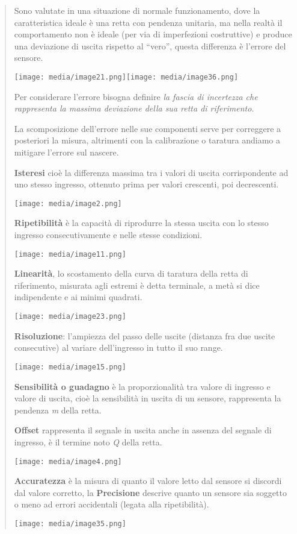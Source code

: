 \begin{quote}
Sono valutate in una situazione di normale funzionamento, dove la
caratteristica ideale è una retta con pendenza unitaria, ma nella realtà
il comportamento non è ideale (per via di imperfezioni costruttive) e
produce una deviazione di uscita rispetto al ``vero'', questa differenza
è l'errore del sensore.

\texttt{[image: media/image21.png]}\texttt{[image: media/image36.png]}

Per considerare l'errore bisogna definire \emph{la fascia di incertezza
che rappresenta la massima deviazione della sua retta di riferimento.}

La scomposizione dell'errore nelle sue componenti serve per correggere a
posteriori la misura, altrimenti con la calibrazione o taratura andiamo
a mitigare l'errore sul nascere.

\textbf{Isteresi} cioè la differenza massima tra i valori di uscita
corrispondente ad uno stesso ingresso, ottenuto prima per valori
crescenti, poi decrescenti.

\texttt{[image: media/image2.png]}

\textbf{Ripetibilità} è la capacità di riprodurre la stessa uscita con
lo stesso ingresso consecutivamente e nelle stesse condizioni.

\texttt{[image: media/image11.png]}

\textbf{Linearità}, lo scostamento della curva di taratura della retta
di riferimento, misurata agli estremi è detta terminale, a metà si dice
indipendente e ai minimi quadrati.

\texttt{[image: media/image23.png]}

\textbf{Risoluzione}: l'ampiezza del passo delle uscite (distanza fra
due uscite consecutive) al variare dell'ingresso in tutto il suo range.

\texttt{[image: media/image15.png]}

\textbf{Sensibilità o guadagno} è la proporzionalità tra valore di
ingresso e valore di uscita, cioè la sensibilità in uscita di un
sensore, rappresenta la pendenza \emph{m} della retta.

\textbf{Offset} rappresenta il segnale in uscita anche in assenza del
segnale di ingresso, è il termine noto \emph{Q} della retta.

\texttt{[image: media/image4.png]}

\textbf{Accuratezza} è la misura di quanto il valore letto dal sensore
si discordi dal valore corretto, la \textbf{Precisione} descrive quanto
un sensore sia soggetto o meno ad errori accidentali (legata alla
ripetibilità).

\texttt{[image: media/image35.png]}
\end{quote}

